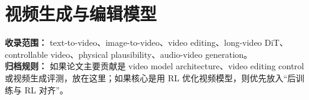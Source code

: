 
\section*{视频生成与编辑模型}
{}

\begin{conceptbox}
\textbf{收录范围：} text-to-video、image-to-video、video editing、long-video DiT、controllable video、physical plausibility、audio-video generation。\\
\textbf{归档规则：} 如果论文主要贡献是 video model architecture、video editing control 或视频生成评测，放在这里；如果核心是用 RL 优化视频模型，则优先放入“后训练与 RL 对齐”。
\end{conceptbox}

